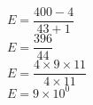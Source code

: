 \begin{corrige}
\begin{spacing}{2}
\begin{itemize}
            {\red
                $E=\dfrac{400 -4}{43 + 1}$\\
                $E=\dfrac{396}{44}$\\
                $E=\dfrac{4\times 9\times 11}{4\times 11}$\\
                $E=9\times 10^0$
            }
        \end{itemize}
    \end{spacing}
\end{corrige}

